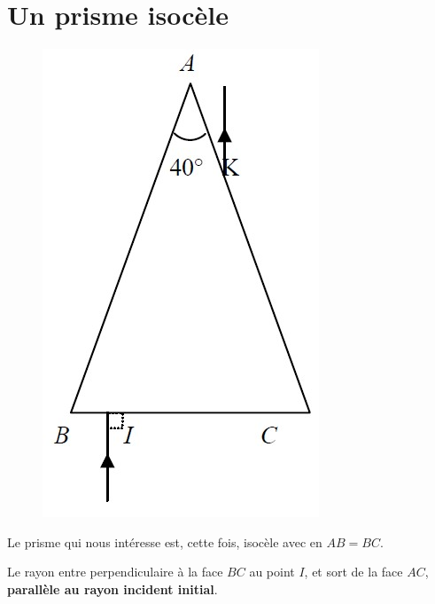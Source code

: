 \documentclass[11pt,a4paper]{article}
\begin{document}
\section{Un prisme isocèle}
\begingroup
\setlength{\intextsep}{0pt}%
\setlength{\columnsep}{0pt}%
\begin{figure}
  \centering\includegraphics[width=0.95\linewidth]{refraction/prisme3.jpg}
\end{figure}

Le prisme qui nous intéresse est, cette fois, isocèle avec en $AB = BC$.

Le rayon entre perpendiculaire à la face $BC$ au point $I$, et sort de la face $AC$, \textbf{parallèle au rayon incident initial}. 
\end{document}
